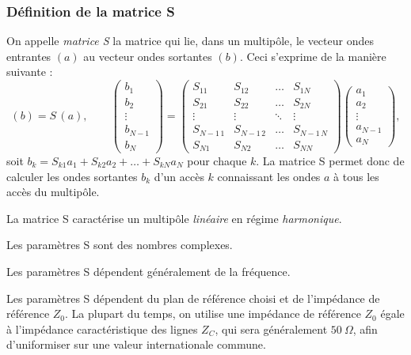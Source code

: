 \subsubsection{Définition de la matrice S}
\begin{definition}[Matrice S]
  On appelle \textit{matrice S} la matrice qui lie, dans un multipôle, le vecteur ondes
  entrantes $(a)$ au vecteur ondes sortantes $(b)$. Ceci s'exprime de la manière
  suivante :
  \[(b) = S\,(a), \qquad
  \begin{pmatrix} b_1 \\ b_2 \\ \vdots \\ b_{N-1} \\ b_N \end{pmatrix}
  =
  \begin{pmatrix}
    S_{11}    & S_{12}    & \dots & S_{1N} \\
    S_{21}    & S_{22}    & \dots & S_{2N} \\
    \vdots    & \vdots    & \ddots& \vdots \\
    S_{N-1\,1}& S_{N-1\,2}& \dots & S_{N-1\,N} \\
    S_{N1}    & S_{N2}    & \dots & S_{NN}
  \end{pmatrix}
  \begin{pmatrix} a_1 \\ a_2 \\ \vdots \\ a_{N-1} \\ a_N \end{pmatrix},\]
  soit $b_k = S_{k1} a_1 + S_{k2} a_2 + \dots + S_{kN} a_N$ pour chaque $k$. La matrice
  S permet donc de calculer les ondes sortantes $b_k$ d'un accès $k$ connaissant les
  ondes $a$ à tous les accès du multipôle.
\end{definition}

\begin{remark}
  \begin{subpart}
    \item La matrice S caractérise un multipôle \emph{linéaire} en régime
      \emph{harmonique}.
    \item Les paramètres S sont des nombres complexes.
    \item Les paramètres S dépendent généralement de la fréquence.
    \item Les paramètres S dépendent du plan de référence choisi et de l'impédance de
      référence $Z_0$. La plupart du temps, on utilise une impédance de référence $Z_0$
      égale à l'impédance caractéristique des lignes $Z_C$, qui sera généralement
      $50\ \Omega$, afin d'uniformiser sur une valeur internationale commune.
  \end{subpart}
\end{remark}


